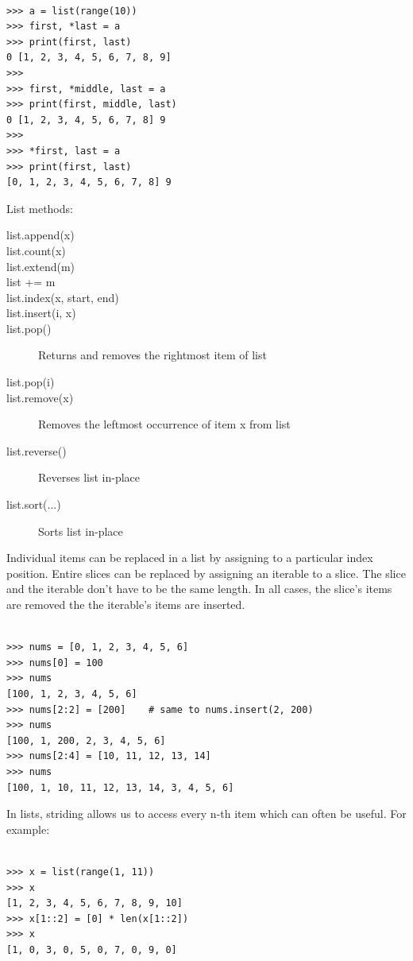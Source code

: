 \begin{lstlisting}

>>> a = list(range(10))
>>> first, *last = a
>>> print(first, last)
0 [1, 2, 3, 4, 5, 6, 7, 8, 9]
>>> 
>>> first, *middle, last = a
>>> print(first, middle, last)
0 [1, 2, 3, 4, 5, 6, 7, 8] 9
>>> 
>>> *first, last = a
>>> print(first, last)
[0, 1, 2, 3, 4, 5, 6, 7, 8] 9
\end{lstlisting}



List methods:
\begin{description}
\item[list.append(x)] 
\item[list.count(x)] 
\item[list.extend(m)] 
\item[list += m] 
\item[list.index(x, start, end)] 
\item[list.insert(i, x)] 
\item[list.pop()] Returns and removes the rightmost item of list
\item[list.pop(i)] 
\item[list.remove(x)] Removes the leftmost occurrence of item x from list
\item[list.reverse()] Reverses list in-place
\item[list.sort(...)] Sorts list in-place
\end{description}


Individual items can be replaced in a list by assigning to a particular index position.
Entire slices can be replaced by assigning an iterable to a slice.
The slice and the iterable don't have to be the same length.
In all cases, the slice's items are removed the the iterable's items are inserted.

\begin{lstlisting}

>>> nums = [0, 1, 2, 3, 4, 5, 6]
>>> nums[0] = 100
>>> nums
[100, 1, 2, 3, 4, 5, 6]
>>> nums[2:2] = [200]    # same to nums.insert(2, 200)
>>> nums
[100, 1, 200, 2, 3, 4, 5, 6]
>>> nums[2:4] = [10, 11, 12, 13, 14]
>>> nums
[100, 1, 10, 11, 12, 13, 14, 3, 4, 5, 6]
\end{lstlisting}


In lists, striding allows us to access every n-th item which can often be useful.
For example:
\begin{lstlisting}

>>> x = list(range(1, 11))
>>> x
[1, 2, 3, 4, 5, 6, 7, 8, 9, 10]
>>> x[1::2] = [0] * len(x[1::2])
>>> x
[1, 0, 3, 0, 5, 0, 7, 0, 9, 0]
\end{lstlisting}


